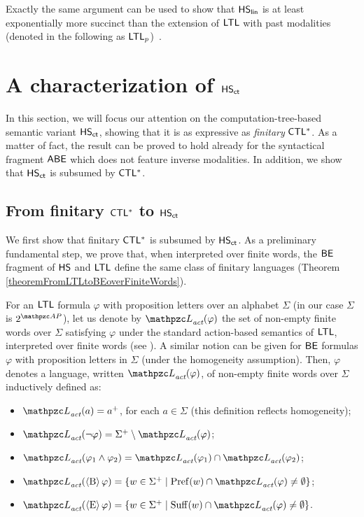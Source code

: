 Exactly the same argument can be used to show that $\text{\sffamily HS}_{\mathsf{lin}}$ is at least exponentially more succinct than the extension of $\text{\sffamily LTL}$ with past modalities (denoted in the following as $\text{\sffamily LTL$_p$}$)~\cite{DBLP:journals/igpl/LichtensteinP00}.

\section{A characterization of $\text{\sffamily HS}_{\mathsf{ct}}$}\label{sec:characterizationHSLinearPast}

In this section, we will focus our attention on the computation-tree-based semantic variant $\text{\sffamily HS}_{\mathsf{ct}}$, showing that  it is as expressive as \emph{finitary} $\text{\sffamily CTL$^{*}$}$. As a matter of fact, the result can be proved to hold already for the syntactical fragment $\mathsf{A}\mathsf{B}\mathsf{E}$ which does not feature inverse modalities. In addition, we show that $\text{\sffamily HS}_{\mathsf{ct}}$ is subsumed by $\text{\sffamily CTL$^{*}$}$.

\subsection{From finitary $\text{\sffamily CTL$^{*}$}$ to $\text{\sffamily HS}_{\mathsf{ct}}$}
We first show that finitary $\text{\sffamily CTL$^{*}$}$ is subsumed by $\text{\sffamily HS}_{\mathsf{ct}}$. 
As a preliminary fundamental step, we prove that,  
when interpreted over finite words, the $\mathsf{BE}$ fragment of $\text{\sffamily HS}$ and $\text{\sffamily LTL}$ 
define the same class of finitary languages (Theorem \ref{theoremFromLTLtoBEoverFiniteWords}).

For an $\text{\sffamily LTL}$ formula $\varphi$ with proposition letters
over  an alphabet $\Sigma$ (in our case $\Sigma$ is  %
 $2^{\Prop}$), let us denote by $\Lang_\act(\varphi)$ %
the set of non-empty finite words over $\Sigma$ satisfying $\varphi$ under the standard action-based semantics of $\text{\sffamily LTL}$, interpreted over finite words (see \cite{vardi1996automata}).
A similar notion can be given for $\mathsf{BE}$ formulas $\varphi$ with proposition letters in $\Sigma$ (under the homogeneity assumption).
Then, $\varphi$ denotes a language, written $\Lang_\act(\varphi)$, of non-empty finite words over $\Sigma$ inductively defined as:
\begin{itemize}
  \item $\Lang_\act(a)= a^{+} $, for each $a\in\Sigma$ (this definition reflects homogeneity);
  \item $\Lang_\act(\neg \varphi)= \Sigma^{+}\setminus \Lang_\act(\varphi)$;
  \item $\Lang_\act(\varphi_1\wedge \varphi_2)=\Lang_\act(\varphi_1)\cap  \Lang_\act(\varphi_2)$;
  \item $\Lang_\act(\hsB \varphi)= \{w\in \Sigma^{+}\mid \Pref(w)\cap \Lang_\act(\varphi)\neq \emptyset\}$;
    \item $\Lang_\act(\hsE \varphi)= \{w\in \Sigma^{+}\mid \Suff(w)\cap \Lang_\act(\varphi)\neq \emptyset\}$.
\end{itemize}

